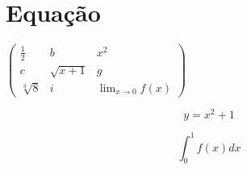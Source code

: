 \documentclass[12pt]{report}
\begin{document}
\section{Equação}
\vspace{2cm}
\begin{center}
$
\left(\begin{array}{ccc}
\frac{1}{2} & b & x^{2} \\
c & \sqrt{x+1} & g \\
\sqrt[3]{8} & i & \displaystyle \lim_{x \rightarrow 0} f(x)
\end{array}\right)
$
\end{center}



\begin{equation}
y = x^2 + 1
\end{equation}

\begin{equation}
\displaystyle\int_0^1 f(x)dx
\end{equation}
\end{document}
